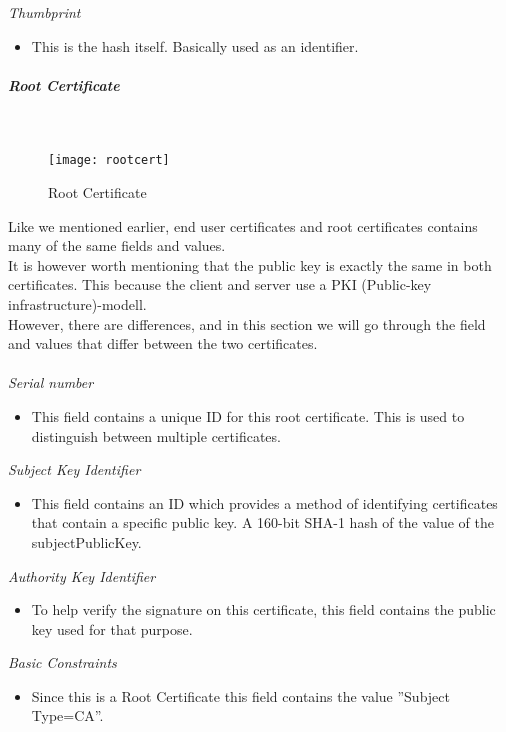 \emph{Thumbprint}
\begin{itemize}
	\item This is the hash itself. Basically used as an identifier.
\end{itemize}
\subparagraph{Root Certificate}~\\
\begin{wrapfigure}{h}{0.35\textwidth}
	\vspace{-30pt}
  \begin{center}
\texttt{[image: rootcert]}
  \end{center}
	\vspace{-20pt}
  \caption{Root Certificate}
\end{wrapfigure}
Like we mentioned earlier, end user certificates and root certificates contains many of the same fields and values.\\
It is however worth mentioning that the public key is exactly the same in both certificates. This because the client and server use a PKI (Public-key infrastructure)-modell.\\
However, there are differences, and in this section we will go through the field and values that differ between the two certificates.\\\\
\emph{Serial number}
\begin{itemize}
	\item This field contains a unique ID for this root certificate. This is used to distinguish between multiple certificates.
\end{itemize}
\emph{Subject Key Identifier}
\begin{itemize}
	\item This field contains an ID which provides a method of identifying certificates that contain a specific public key. A 160-bit SHA-1 hash of the value of the subjectPublicKey.
\end{itemize}
\emph{Authority Key Identifier}
\begin{itemize}
	\item To help verify the signature on this certificate, this field contains the public key used for that purpose.
\end{itemize}
\emph{Basic Constraints}
\begin{itemize}
	\item Since this is a Root Certificate this field contains the value ''Subject Type=CA''.
\end{itemize}
